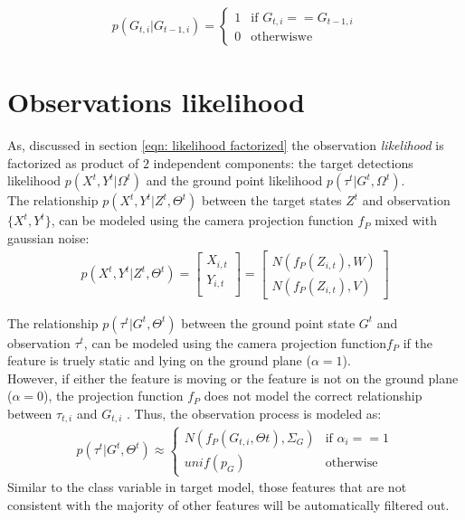 \begin{eqnarray} \label{eqn: Ground dynamics}
 p(G_{t,i} |G_{t-1,i})= \left\{
\begin{array}{rl}
1 & \mbox{if }  G_{t,i}==G_{t-1,i} \\
0 & \mbox{otherwiswe } 
\end{array}
\right.
\end{eqnarray}

\section{Observations likelihood}
As, discussed in section \ref{eqn: likelihood factorized} the observation \textit{likelihood} is factorized as product of $2$ independent components:
the target detections likelihood $p(X^{t}, Y^t | \Omega^{t})$ and the ground point likelihood $p(\tau^{t} | G^t , \Omega^{t})$.\\
The relationship $p(X^t, Y^t |Z^t, \Theta^t)$ between the target states $Z^t$ and observation $\{X^t, Y^t \}$, can be modeled using the camera projection function $f_P$ mixed with gaussian noise:
\begin{eqnarray} \label{eqn: camera dynamics}
p(X^t,Y^t | Z^t , \Theta^t )= 
 \left[
\begin{array}{c}
X_{i,t}  \\
Y_{i,t}  \\
\end{array}
\right]
=
\left[
\begin{array}{c}
N(f_P(Z_{i,t}),W) \\
N(f_P(Z_{i,t}),V)
\end{array}
\right]
\end{eqnarray}

The relationship $p(\tau^t |G^t , \Theta^t )$ between the ground point state $G^t$ and observation $\tau^t$,  can be modeled using the camera projection function$ f_P$ if the feature is truely static and lying on the ground plane ($\alpha=1$). \\
However, if either the feature is moving or the feature is not on the ground plane ($\alpha=0$), the projection function $f_P$ does not model the correct relationship between $\tau_{t,i}$ and $G_{t,i}$ . 
Thus, the observation process is modeled as:
\begin{eqnarray} \label{eqn: Ground observation Model}
p(\tau^t | G^t , \Theta^t ) \approx
\left\{
\begin{array}{rl}
 N(f_P (G_{t,i} , Θt ), \Sigma_G ) & \mbox{if }  \alpha_i==1 \\
 unif (p_G )  & \mbox{otherwise }
\end{array}
 \right.
\end{eqnarray}
Similar to the class variable in target model, those features that are not consistent with the majority of other features will be automatically filtered out.

